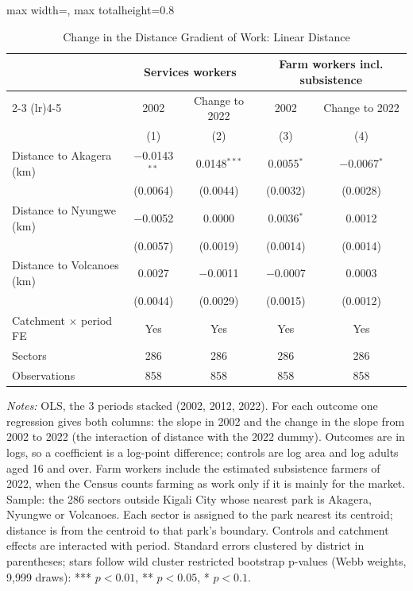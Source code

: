 \documentclass[11pt]{article}
\begin{document}
\begin{table}[H]
\centering\footnotesize\setlength{\tabcolsep}{4pt}
\caption{Change in the Distance Gradient of Work: Linear Distance}
\label{tab:mt_gradient_linear}
\begin{adjustbox}{max width=\textwidth, max totalheight=0.8\textheight}
\begin{tabular}{lcccc}
\toprule
 & \multicolumn{2}{c}{Services workers} & \multicolumn{2}{c}{Farm workers incl. subsistence} \\
\cmidrule(lr){2-3} \cmidrule(lr){4-5}
 & 2002 & Change to 2022 & 2002 & Change to 2022 \\
 & (1) & (2) & (3) & (4) \\
\midrule
Distance to Akagera (km) & $-$0.0143$^{**}$ & 0.0148$^{***}$ & 0.0055$^{*}$ & $-$0.0067$^{*}$ \\
 & (0.0064) & (0.0044) & (0.0032) & (0.0028) \\
Distance to Nyungwe (km) & $-$0.0052 & 0.0000 & 0.0036$^{*}$ & 0.0012 \\
 & (0.0057) & (0.0019) & (0.0014) & (0.0014) \\
Distance to Volcanoes (km) & 0.0027 & $-$0.0011 & $-$0.0007 & 0.0003 \\
 & (0.0044) & (0.0029) & (0.0015) & (0.0012) \\
\midrule
Catchment $\times$ period FE & Yes & Yes & Yes & Yes \\
Sectors & 286 & 286 & 286 & 286 \\
Observations & 858 & 858 & 858 & 858 \\
\bottomrule
\end{tabular}
\end{adjustbox}
\begin{minipage}{0.97\textwidth}\scriptsize
\textit{Notes:} OLS, the 3 periods stacked (2002, 2012, 2022). For each outcome one regression gives both columns: the slope in 2002 and the change in the slope from 2002 to 2022 (the interaction of distance with the 2022 dummy). Outcomes are in logs, so a coefficient is a log-point difference; controls are log area and log adults aged 16 and over. Farm workers include the estimated subsistence farmers of 2022, when the Census counts farming as work only if it is mainly for the market. Sample: the 286 sectors outside Kigali City whose nearest park is Akagera, Nyungwe or Volcanoes. Each sector is assigned to the park nearest its centroid; distance is from the centroid to that park's boundary. Controls and catchment effects are interacted with period. Standard errors clustered by district in parentheses; stars follow wild cluster restricted bootstrap p-values (Webb weights, 9,999 draws): *** $p<0.01$, ** $p<0.05$, * $p<0.1$.
\end{minipage}
\end{table}
\end{document}
